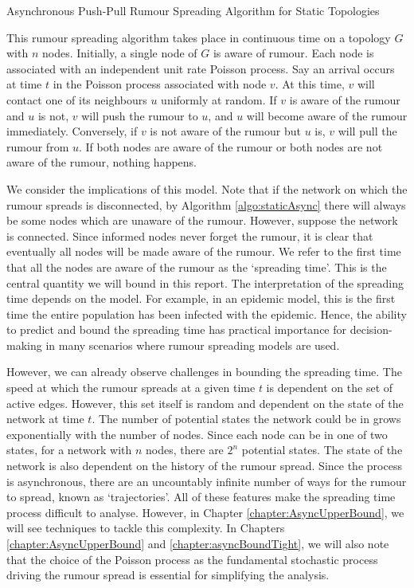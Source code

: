 \begin{definition}\label{algo:staticAsync}
	Asynchronous Push-Pull Rumour Spreading Algorithm for Static Topologies

	\noindent
	This rumour spreading algorithm takes place in continuous time on a topology $G$ with $n$ nodes.
	Initially, a single node of $G$ is aware of rumour. Each node is associated with an independent unit rate Poisson process. Say an arrival occurs at time $t$ in the Poisson process associated with node $v$. At this time, $v$ will contact one of its neighbours $u$ uniformly at random. If $v$ is aware of the rumour and $u$ is not, $v$ will push the rumour to $u$, and $u$ will become aware of the rumour immediately. Conversely, if $v$ is not aware of the rumour but $u$ is, $v$ will pull the rumour from $u$. If both nodes are aware of the rumour or both nodes are not aware of the rumour, nothing happens.
\end{definition}

We consider the implications of this model. 
Note that if the network on which the rumour spreads is disconnected, by Algorithm \ref{algo:staticAsync} there will always be some nodes which are unaware of the rumour. However, suppose the network is connected.
Since informed nodes never forget the rumour, it is clear that eventually all nodes will be made aware of the rumour. We refer to the first time that all the nodes are aware of the rumour as the `spreading time'. This is the central quantity we will bound in this report. The interpretation of the spreading time depends on the model. For example, in an epidemic model, this is the first time the entire population has been infected with the epidemic. Hence, the ability to predict and bound the spreading time has practical importance for decision-making in many scenarios where rumour spreading models are used.

However, we can already observe challenges in bounding the spreading time. The speed at which the rumour spreads at a given time $t$ is dependent on the set of active edges. However, this set itself is random and dependent on the state of the network at time $t$. The number of potential states the network could be in grows exponentially with the number of nodes. Since each node can be in one of two states, for a network with $n$ nodes, there are $2^n$ potential states. The state of the network is also dependent on the history of the rumour spread.
Since the process is asynchronous, there are an uncountably infinite number of ways for the rumour to spread, known as `trajectories'. All of these features make the spreading time process difficult to analyse. However, in Chapter \ref{chapter:AsyncUpperBound}, we will see techniques to tackle this complexity. In Chapters \ref{chapter:AsyncUpperBound} and \ref{chapter:asyncBoundTight}, we will also note that the choice of the Poisson process as the fundamental stochastic process driving the rumour spread is essential for simplifying the analysis.

